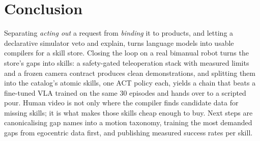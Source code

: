 \documentclass[10pt,twocolumn,letterpaper]{article}
\begin{document}
\section{Conclusion}
Separating \emph{acting out} a request from \emph{binding} it to products, and letting a declarative simulator veto and
explain, turns language models into usable compilers for a skill store. Closing the loop on a real bimanual robot turns
the store's gaps into skills: a safety-gated teleoperation stack with measured limits and a frozen camera contract
produces clean demonstrations, and splitting them into the catalog's atomic skills, one ACT policy each, yields a chain
that beats a fine-tuned VLA trained on the same 30 episodes and hands over to a scripted pour. Human video is not only where the compiler finds candidate data for missing
skills; it is what makes those skills cheap enough to buy. Next steps are canonicalising gap names into a motion
taxonomy, training the most demanded gaps from egocentric data first, and publishing measured success rates per skill.
\end{document}

